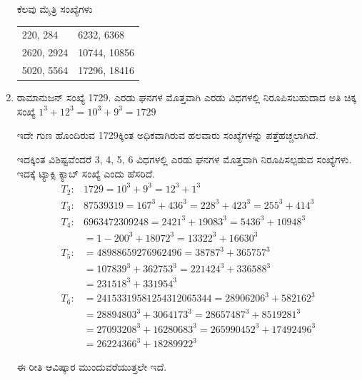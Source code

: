 \begin{enumerate}
\vskip 0.1cm

ಕೆಲವು ಮೈತ್ರಿ ಸಂಖ್ಯೆಗಳು 

\begin{tabular}[t]{ll}
220, 284 & 6232, 6368\\
2620, 2924 & 10744, 10856\\
5020, 5564 & 17296, 18416
\end{tabular}

\item ರಾಮಾನುಜನ್ ಸಂಖ್ಯೆ  1729. ಎರಡು ಘನಗಳ ಮೊತ್ತವಾಗಿ ಎರಡು ವಿಧಗಳಲ್ಲಿ ನಿರೂಪಿಸಬಹುದಾದ ಅತಿ ಚಿಕ್ಕ ಸಂಖ್ಯೆ  $1^{3} + 12^{3} = 10^{3} + 9^{3} = 1729$

ಇದೇ ಗುಣ ಹೊಂದಿರುವ 1729ಕ್ಕಿಂತ ಅಧಿಕವಾಗಿರುವ ಹಲವಾರು ಸಂಖ್ಯೆಗಳನ್ನು ಪತ್ತೆಹಚ್ಚಲಾಗಿದೆ. 

\vskip 0.1cm

{\fontsize{10}{12}}

\vskip 0.1cm

ಇದಕ್ಕಿಂತ ವಿಶಿಷ್ಟವೆಂದರೆ 3, 4, 5, 6 ವಿಧಗಳಲ್ಲಿ ಎರಡು ಘನಗಳ ಮೊತ್ತವಾಗಿ ನಿರೂಪಿಸಲ್ಪಡುವ ಸಂಖ್ಯೆಗಳು. ಇದಕ್ಕೆ ಟ್ಯಾಕ್ಸಿ ಕ್ಯಾಬ್ ಸಂಖ್ಯೆ ಎಂದು ಹೆಸರಿದೆ.
\begin{align*}
T_{2} : & 1729 = 10^{3} + 9^{3} = 12^{3} + 1^{3}\\[0.1cm]
T_{3} : & 87539319 = 167^{3} + 436^{3} = 228^{3} + 423^{3} = 255^{3} + 414^{3}\\[0.1cm]
T_{4} : & 6963472309248 = 2421^{3} + 19083^{3} = 5436^{3} + 10948^{3}\\[0.1cm]
& = 1-200^{3} + 18072^{3} = 13322^{3} + 16630^{3}\\[0.1cm]
T_{5} : & = 48988659276962496 = 38787^{3} + 365757^{3}\\[0.1cm] 
& = 107839^{3} + 362753^{3} = 221424^{3} + 336588^{3}\\[0.1cm]
& = 231518^{3} + 331954^{3}\\[0.1cm]
T_{6} : & = 24153319581254312065344= 28906206^{3} + 582162^{3}\\[0.1cm]
& = 28894803^{3} + 3064173^{3} = 28657487^{3} + 8519281^{3}\\[0.1cm]
& = 27093208^{3} + 16280683^{3} = 265990452^{3} + 17492496^{3}\\[0.1cm]
& = 26224366^{3} + 18289922^{3}
\end{align*}

ಈ ರೀತಿ ಆವಿಷ್ಕಾರ ಮುಂದುವರೆಯುತ್ತಲೇ ಇದೆ. 
\end{enumerate}

